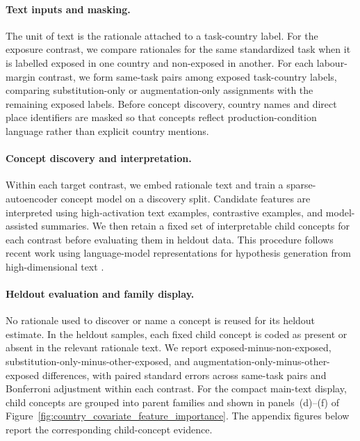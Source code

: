 \documentclass[11pt]{article}
\begin{document}
\paragraph{Text inputs and masking.}

The unit of text is the rationale attached to a task-country label. For the exposure contrast, we compare rationales for the same standardized task when it is labelled exposed in one country and non-exposed in another. For each labour-margin contrast, we form same-task pairs among exposed task-country labels, comparing substitution-only or augmentation-only assignments with the remaining exposed labels. Before concept discovery, country names and direct place identifiers are masked so that concepts reflect production-condition language rather than explicit country mentions.

\paragraph{Concept discovery and interpretation.}

Within each target contrast, we embed rationale text and train a sparse-autoencoder concept model on a discovery split. Candidate features are interpreted using high-activation text examples, contrastive examples, and model-assisted summaries. We then retain a fixed set of interpretable child concepts for each contrast before evaluating them in heldout data. This procedure follows recent work using language-model representations for hypothesis generation from high-dimensional text \citep{LudwigMullainathan2024HypothesisGeneration,MovvaEtAl2025HypotheSAEs}.

\paragraph{Heldout evaluation and family display.}

No rationale used to discover or name a concept is reused for its heldout estimate. In the heldout samples, each fixed child concept is coded as present or absent in the relevant rationale text. We report exposed-minus-non-exposed, substitution-only-minus-other-exposed, and augmentation-only-minus-other-exposed differences, with paired standard errors across same-task pairs and Bonferroni adjustment within each contrast. For the compact main-text display, child concepts are grouped into parent families and shown in panels~(d)--(f) of Figure~\ref{fig:country_covariate_feature_importance}. The appendix figures below report the corresponding child-concept evidence.
\end{document}
